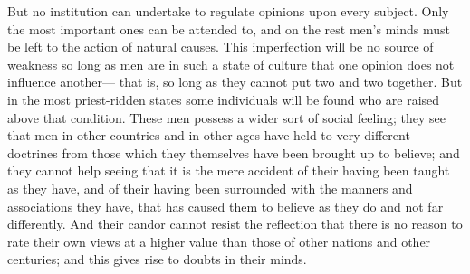 But no institution can undertake to regulate opinions upon every subject. Only the most important ones can be attended to, and on the rest men's minds must be left to the action of natural causes. This imperfection will be no source of weakness so long as men are in such a state of culture that one opinion does not influence another--- that is, so long as they cannot put two and two together. But in the most priest-ridden states some individuals will be found who are raised above that condition. These men possess a wider sort of social feeling; they see that men in other countries and in other ages have held to very different doctrines from those which they themselves have been brought up to believe; and they cannot help seeing that it is the mere accident of their having been taught as they have, and of their having been surrounded with the manners and associations they have, that has caused them to believe as they do and not far differently. And their candor cannot resist the reflection that there is no reason to rate their own views at a higher value than those of other nations and other centuries; and this gives rise to doubts in their minds.

